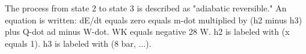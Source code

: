 The process from state 2 to state 3 is described as "adiabatic reversible."  
An equation is written:  
dE/dt equals zero equals m-dot multiplied by (h2 minus h3) plus Q-dot ad minus W-dot.  
WK equals negative 28 W.  
h2 is labeled with (x equals 1).  
h3 is labeled with (8 bar, ...).